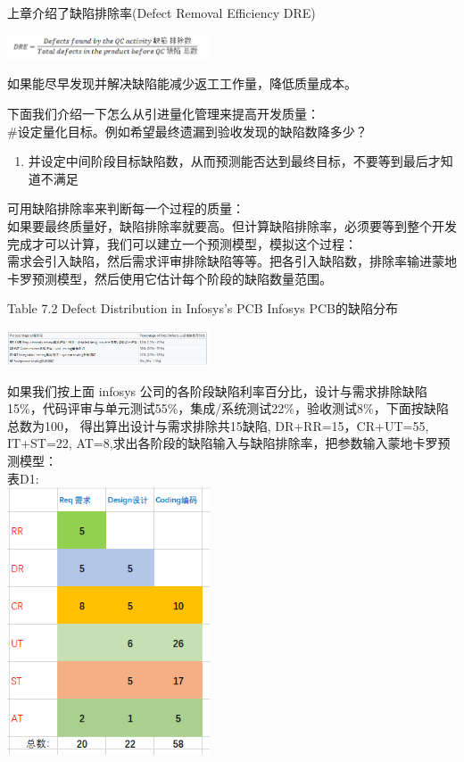 上章介绍了缺陷排除率(Defect Removal Efficiency DRE)


\includegraphics[width=6cm]{Ma3_10.png}

如果能尽早发现并解决缺陷能减少返工工作量，降低质量成本。

下面我们介绍一下怎么从引进量化管理来提高开发质量：\\
\#设定量化目标。例如希望最终遗漏到验收发现的缺陷数降多少？

\begin{enumerate}
\tightlist
\item
  并设定中间阶段目标缺陷数，从而预测能否达到最终目标，不要等到最后才知道不满足
\end{enumerate}

可用缺陷排除率来判断每一个过程的质量：\\
如果要最终质量好，缺陷排除率就要高。但计算缺陷排除率，必须要等到整个开发完成才可以计算，我们可以建立一个预测模型，模拟这个过程：\\
需求会引入缺陷，然后需求评审排除缺陷等等。把各引入缺陷数，排除率输进蒙地卡罗预测模型，然后使用它估计每个阶段的缺陷数量范围。

Table 7.2 Defect Distribution in Infosys's PCB Infosys PCB的缺陷分布


\includegraphics[width=6cm]{Screenshotfrom2023-10-1023-46-22.png}

如果我们按上面 infosys
公司的各阶段缺陷利率百分比，设计与需求排除缺陷15\%，代码评审与单元测试55\%，集成/系统测试22\%，验收测试8\%，下面按缺陷总数为100，
得出算出设计与需求排除共15缺陷, DR+RR=15，CR+UT=55, IT+ST=22,
AT=8,求出各阶段的缺陷输入与缺陷排除率，把参数输入蒙地卡罗预测模型：\\
表D1:\\
\includegraphics[width=6cm]{1113correctEgScreenshot_2021-11-13_212414.png}


